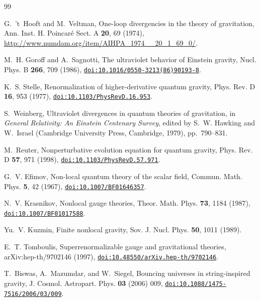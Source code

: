 \documentclass[aps,prd,10pt,twocolumn,superscriptaddress,nofootinbib,floatfix,longbibliography,showpacs,showkeys]{revtex4-2}
\theoremstyle{plain}
\theoremstyle{definition}
\theoremstyle{remark}
\begin{document}
\makeatletter
\renewcommand\bibcite[2]{\global\@namedef{b@#1\@extra@binfo}{#2}}
\makeatother
\begin{thebibliography}{99}

G.~'t~Hooft and M.~Veltman, One-loop divergencies in the theory of gravitation, Ann. Inst. H. Poincar\'e Sect. A \textbf{20}, 69 (1974), \url{http://www.numdam.org/item/AIHPA_1974__20_1_69_0/}.

M.~H. Goroff and A.~Sagnotti, The ultraviolet behavior of Einstein gravity, Nucl. Phys. B \textbf{266}, 709 (1986), \href{https://doi.org/10.1016/0550-3213(86)90193-8}{\nolinkurl{doi:10.1016/0550-3213(86)90193-8}}.

K.~S. Stelle, Renormalization of higher-derivative quantum gravity, Phys. Rev. D \textbf{16}, 953 (1977), \href{https://doi.org/10.1103/PhysRevD.16.953}{\nolinkurl{doi:10.1103/PhysRevD.16.953}}.

S.~Weinberg, Ultraviolet divergences in quantum theories of gravitation, in \emph{General Relativity: An Einstein Centenary Survey}, edited by S.~W. Hawking and W.~Israel (Cambridge University Press, Cambridge, 1979), pp.~790--831.

M.~Reuter, Nonperturbative evolution equation for quantum gravity, Phys. Rev. D \textbf{57}, 971 (1998), \href{https://doi.org/10.1103/PhysRevD.57.971}{\nolinkurl{doi:10.1103/PhysRevD.57.971}}.

G.~V. Efimov, Non-local quantum theory of the scalar field, Commun. Math. Phys. \textbf{5}, 42 (1967), \href{https://doi.org/10.1007/BF01646357}{\nolinkurl{doi:10.1007/BF01646357}}.

N.~V. Krasnikov, Nonlocal gauge theories, Theor. Math. Phys. \textbf{73}, 1184 (1987), \href{https://doi.org/10.1007/BF01017588}{\nolinkurl{doi:10.1007/BF01017588}}.

Yu.~V. Kuzmin, Finite nonlocal gravity, Sov. J. Nucl. Phys. \textbf{50}, 1011 (1989).

E.~T. Tomboulis, Superrenormalizable gauge and gravitational theories, arXiv:hep-th/9702146 (1997), \href{https://doi.org/10.48550/arXiv.hep-th/9702146}{\nolinkurl{doi:10.48550/arXiv.hep-th/9702146}}.

T.~Biswas, A.~Mazumdar, and W.~Siegel, Bouncing universes in string-inspired gravity, J. Cosmol. Astropart. Phys. \textbf{03} (2006) 009, \href{https://doi.org/10.1088/1475-7516/2006/03/009}{\nolinkurl{doi:10.1088/1475-7516/2006/03/009}}.


\end{thebibliography}
\end{document}
